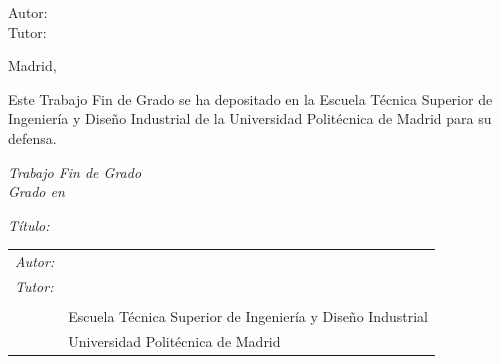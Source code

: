 \begin{titlepage}
  \vspace*{0.5cm}
  \begin{center}
    \huge\bfseries {  \TituloTFG{} }
  \end{center}

  \vspace*{5cm}

  \noindent
  \large{Autor: \NombreAutor{} }\\
  \large{Tutor: \NombreTutor{} }


  \vspace*{4cm}
  \begin{center}
    Madrid, \Fecha
  \end{center}

  \newpage
  \thispagestyle{empty}
  \noindent
  Este Trabajo Fin de Grado se ha depositado en la Escuela Técnica Superior de Ingeniería y Diseño Industrial de la Universidad Politécnica de Madrid para su defensa.

  \vspace*{4cm}
  \noindent
  \textit{Trabajo Fin de Grado}\\
  \textit{Grado en} \Grado{}
  
  \textit{Título:} \TituloTFG{}

  \Fecha

  \vspace*{3cm}

  \noindent
  \begin{tabular}{ll}
     \textit{Autor:} & \NombreAutor{}  \\
     \textit{Tutor:} & \NombreTutor{}  \\
     & \Departamento{} \\
     & Escuela Técnica Superior de Ingeniería y Diseño Industrial \\
     & Universidad Politécnica de Madrid
  \end{tabular}

\end{titlepage}
